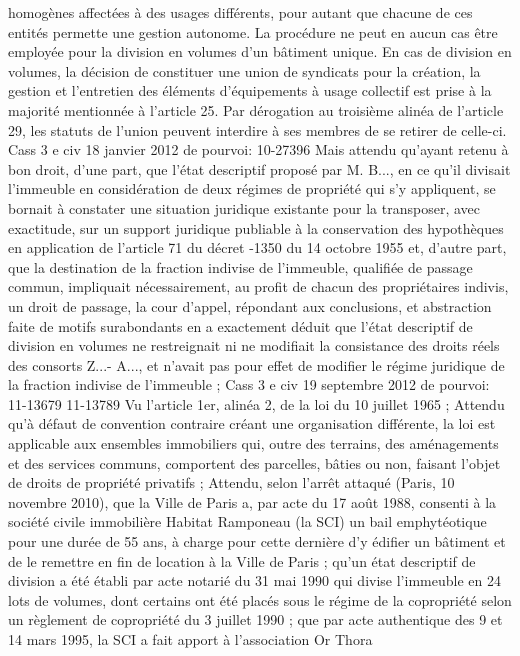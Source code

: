 \documentclass[11pt,a4paper]{report}
\begin{document}
	homogènes affectées à des usages différents, pour autant que chacune de ces entités permette une gestion
	autonome.
	La procédure ne peut en aucun cas être employée pour la division en volumes d'un bâtiment unique.
	En cas de division en volumes, la décision de constituer une union de syndicats pour la création, la gestion et
	l'entretien des éléments d'équipements à usage collectif est prise à la majorité mentionnée à l'article 25.
	Par dérogation au troisième alinéa de l'article 29, les statuts de l'union peuvent interdire à ses membres de se
	retirer de celle-ci.
	Cass 3 e civ 18 janvier 2012 \No  de pourvoi: 10-27396
	Mais attendu qu'ayant retenu à bon droit, d'une part, que l'état descriptif proposé par M. B..., en ce qu'il divisait
	l'immeuble en considération de deux régimes de propriété qui s'y appliquent, se bornait à constater une situation
	juridique existante pour la transposer, avec exactitude, sur un support juridique publiable à la conservation des
	hypothèques en application de l'article 71 du décret -1350 du 14 octobre 1955 et, d'autre part, que la
	destination de la fraction indivise de l'immeuble, qualifiée de passage commun, impliquait nécessairement, au
	profit de chacun des propriétaires indivis, un droit de passage, la cour d'appel, répondant aux conclusions, et
	abstraction faite de motifs surabondants en a exactement déduit que l'état descriptif de division en volumes ne
	restreignait ni ne modifiait la consistance des droits réels des consorts Z...- A..., et n'avait pas pour effet de
	modifier le régime juridique de la fraction indivise de l'immeuble ;
	Cass 3 e civ 19 septembre 2012 \No  de pourvoi: 11-13679 11-13789
	Vu l'article 1er, alinéa 2, de la loi du 10 juillet 1965 ;
	Attendu qu'à défaut de convention contraire créant une organisation différente, la loi est applicable aux
	ensembles immobiliers qui, outre des terrains, des aménagements et des services communs, comportent des
	parcelles, bâties ou non, faisant l'objet de droits de propriété privatifs ;
	Attendu, selon l'arrêt attaqué (Paris, 10 novembre 2010), que la Ville de Paris a, par acte du 17 août 1988,
	consenti à la société civile immobilière Habitat Ramponeau (la SCI) un bail emphytéotique pour une durée de 55
	ans, à charge pour cette dernière d'y édifier un bâtiment et de le remettre en fin de location à la Ville de Paris ;
	qu'un état descriptif de division a été établi par acte notarié du 31 mai 1990 qui divise l'immeuble en 24 lots de
	volumes, dont certains ont été placés sous le régime de la copropriété selon un règlement de copropriété du 3
	juillet 1990 ; que par acte authentique des 9 et 14 mars 1995, la SCI a fait apport à l'association Or Thora
\end{document}
